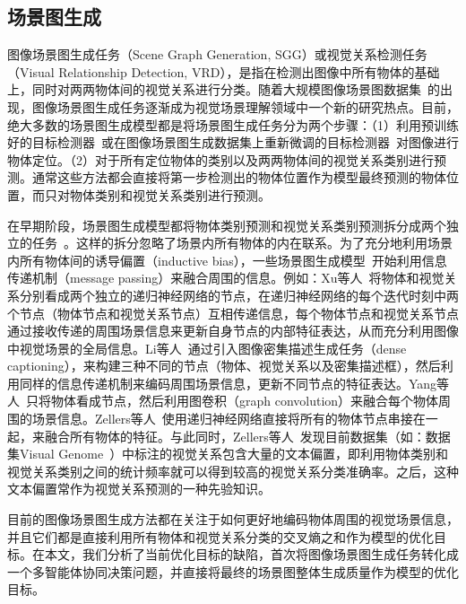 \subsection{场景图生成}
图像场景图生成任务（Scene Graph Generation, SGG）或视觉关系检测任务（Visual Relationship Detection, VRD），是指在检测出图像中所有物体的基础上，同时对两两物体间的视觉关系进行分类。随着大规模图像场景图数据集~\cite{krishna2017visual}的出现，图像场景图生成任务逐渐成为视觉场景理解领域中一个新的研究热点。目前，绝大多数的场景图生成模型都是将场景图生成任务分为两个步骤：（1）利用预训练好的目标检测器~\cite{lu2016visual,zhuang2017towards,zhang2017visual,dai2017detecting,yang2018shuffle,yu2017visual}或在图像场景图生成数据集上重新微调的目标检测器~\cite{li2017vip,xu2017scene,yin2018zoom,zellers2018neural,zhang2017relationship,zhang2019large}对图像进行物体定位。（2）对于所有定位物体的类别以及两两物体间的视觉关系类别进行预测。通常这些方法都会直接将第一步检测出的物体位置作为模型最终预测的物体位置，而只对物体类别和视觉关系类别进行预测。


在早期阶段，场景图生成模型都将物体类别预测和视觉关系类别预测拆分成两个独立的任务~\cite{lu2016visual,zhang2017visual,zhuang2017towards,zhu2018deep,zhang2017relationship}。这样的拆分忽略了场景内所有物体的内在联系。为了充分地利用场景内所有物体间的诱导偏置（inductive bias），一些场景图生成模型~\cite{xu2017scene,dai2017detecting,li2017scene,li2018factorizable,yin2018zoom,jae2018tensorize,yang2018graph,tang2019learning,gu2019scene,qi2019attentive,wang2019exploring}开始利用信息传递机制（message passing）来融合周围的信息。例如：Xu等人~\cite{xu2017scene}将物体和视觉关系分别看成两个独立的递归神经网络的节点，在递归神经网络的每个迭代时刻中两个节点（物体节点和视觉关系节点）互相传递信息，每个物体节点和视觉关系节点通过接收传递的周围场景信息来更新自身节点的内部特征表达，从而充分利用图像中视觉场景的全局信息。Li等人~\cite{li2017scene}通过引入图像密集描述生成任务（dense captioning），来构建三种不同的节点（物体、视觉关系以及密集描述框），然后利用同样的信息传递机制来编码周围场景信息，更新不同节点的特征表达。Yang等人~\cite{yang2018graph}只将物体看成节点，然后利用图卷积（graph convolution）来融合每个物体周围的场景信息。Zellers等人~\cite{zellers2018neural}使用递归神经网络直接将所有的物体节点串接在一起，来融合所有物体的特征。与此同时，Zellers等人~\cite{zellers2018neural}发现目前数据集（如：数据集Visual Genome~\cite{krishna2017visual}）中标注的视觉关系包含大量的文本偏置，即利用物体类别和视觉关系类别之间的统计频率就可以得到较高的视觉关系分类准确率。之后，这种文本偏置常作为视觉关系预测的一种先验知识。

目前的图像场景图生成方法都在关注于如何更好地编码物体周围的视觉场景信息，并且它们都是直接利用所有物体和视觉关系分类的交叉熵之和作为模型的优化目标。在本文，我们分析了当前优化目标的缺陷，首次将图像场景图生成任务转化成一个多智能体协同决策问题，并直接将最终的场景图整体生成质量作为模型的优化目标。

